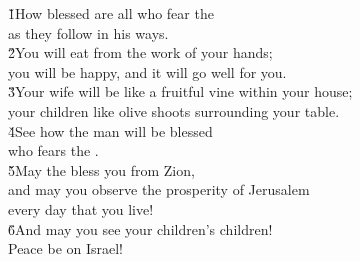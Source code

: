 \begin{poetry}
\poeml \v{1}How blessed are all who fear the  \\
\poemll    as they follow in his ways. \\
\poeml \v{2}You will eat from the work of your hands; \\
\poemll    you will be happy, and it will go well for you. \\
\poeml \v{3}Your wife will be like a fruitful vine within your house; \\
\poemll    your children like olive shoots surrounding your table. \\
\poeml \v{4}See how the man will be blessed \\
\poemll    who fears the . \\
\poeml \v{5}May the  bless you from Zion, \\
\poemll    and may you observe the prosperity of Jerusalem \\
\poemlll       every day that you live! \\
\poeml \v{6}And may you see your children's children! \\
\poemll    Peace be on Israel!
\end{poetry}

